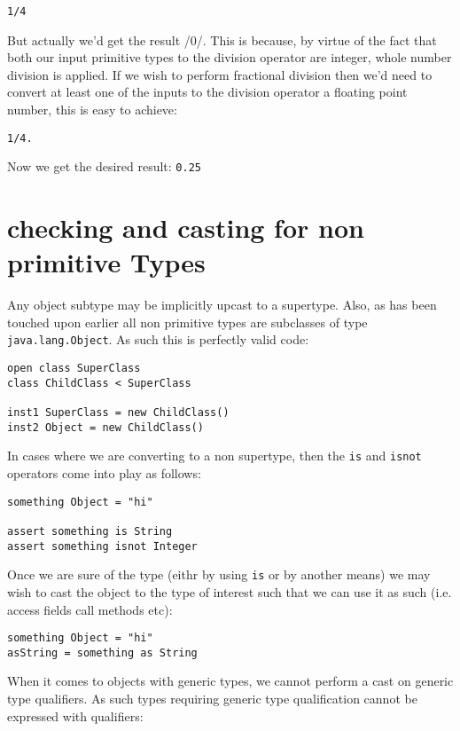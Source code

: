 \documentclass[conc-doc]{subfiles}
\begin{document}
\begin{lstlisting}
1/4
\end{lstlisting}

But actually we'd get the result /0/. This is because, by virtue of the fact that both our input primitive types to the division operator are integer, whole number division is applied. If we wish to perform fractional division then we'd need to convert at least one of the inputs to the division operator a floating point number, this is easy to achieve:

\begin{lstlisting}
1/4.
\end{lstlisting}

Now we get the desired result: \lstinline{0.25}

\section{checking and casting for non primitive Types}
Any object subtype may be implicitly upcast to a supertype. Also, as has been touched upon earlier all non primitive types are subclasses of type \lstinline{java.lang.Object}. As such this is perfectly valid code:

\begin{lstlisting}
open class SuperClass
class ChildClass < SuperClass

inst1 SuperClass = new ChildClass()
inst2 Object = new ChildClass()
\end{lstlisting}

In cases where we are converting to a non supertype, then the \lstinline{is} and \lstinline{isnot} operators come into play as follows:

\begin{lstlisting}
something Object = "hi"

assert something is String
assert something isnot Integer
\end{lstlisting}

Once we are sure of the type (eithr by using \lstinline{is} or by another means) we may wish to cast the object to the type of interest such that we can use it as such (i.e. access fields call methods etc):

\begin{lstlisting}
something Object = "hi"
asString = something as String
\end{lstlisting}

When it comes to objects with generic types, we cannot perform a cast on generic type qualifiers. As such types requiring generic type qualification cannot be expressed with qualifiers:
\end{document}
